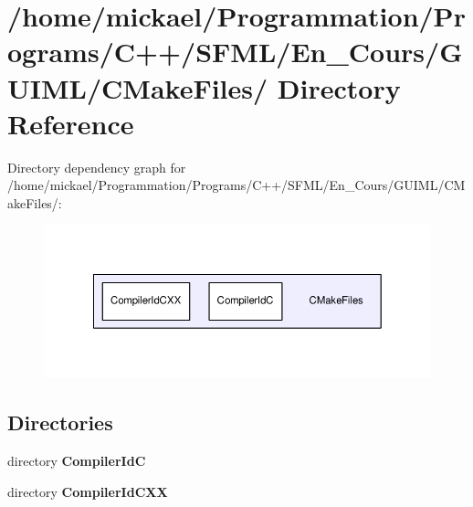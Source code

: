 \section{/home/mickael/\-Programmation/\-Programs/\-C++/\-S\-F\-M\-L/\-En\-\_\-\-Cours/\-G\-U\-I\-M\-L/\-C\-Make\-Files/ Directory Reference}
\label{dir_9e8a146608d450a2f6edfd2455143f01}
Directory dependency graph for /home/mickael/\-Programmation/\-Programs/\-C++/\-S\-F\-M\-L/\-En\-\_\-\-Cours/\-G\-U\-I\-M\-L/\-C\-Make\-Files/\-:\nopagebreak
\begin{figure}[H]
\begin{center}
\leavevmode
\includegraphics[width=350pt]{dir_9e8a146608d450a2f6edfd2455143f01_dep}
\end{center}
\end{figure}
\subsection*{Directories}
\begin{DoxyCompactItemize}
\item 
directory {\bf Compiler\-Id\-C}
\item 
directory {\bf Compiler\-Id\-C\-X\-X}
\end{DoxyCompactItemize}
